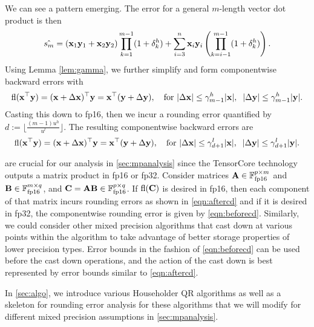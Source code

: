We can see a pattern emerging. 
The error for a general $m$-length vector dot product is then
\begin{equation}
\label{eqn:dperr_2}
\hat{s_m} = (\bb{x}_1\bb{y}_1+\bb{x}_2\bb{y}_2)\prod_{k=1}^{m-1}(1+\dd_{k}^h) + \sum_{i=3}^n \bb{x}_i\bb{y}_i\left(\prod_{k=i-1}^{m-1}(1+\dd_{k}^{h})\right).
\end{equation}
Using Lemma \ref{lem:gamma}, we further simplify and form componentwise backward errors with
\begin{equation}
\fl(\bb{x}^{\top}\bb{y}) =(\bb{x}+\Delta\bb{x})^{\top}\bb{y} = \bb{x}^{\top}(\bb{y}+\Delta\bb{y}),\quad\text{for }|\Delta \bb{x}| \leq \gamma^h_{m-1}|\bb{x}|,\;\; |\Delta \bb{y}|  \leq \gamma_{m-1}^h|\bb{y}|. \label{eqn:beforecd}
\end{equation}
Casting this down to fp16, then we incur a rounding error quantified by $d:=\lfloor\frac{(m-1)u^h}{u^l}\rfloor$. 
The resulting componentwise backward errors are
\begin{equation}
\fl(\bb{x}^{\top}\bb{y}) = (\bb{x}+\Delta\bb{x})^{\top}\bb{y} = \bb{x}^{\top}(\bb{y}+\Delta\bb{y}),\quad\text{for }|\Delta \bb{x}| \leq \gamma^l_{d+1}|\bb{x}|,\;\; |\Delta \bb{y}|  \leq \gamma_{d+1}^l|\bb{y}|. \label{eqn:aftercd}
\end{equation}

 are crucial for our analysis in \cref{sec:mpanalysis} since the TensorCore technology outputs a matrix product in fp16 or fp32. 
Consider matrices $\mathbf{A}\in\mathbb{F}_{\text{fp16}}^{p\times m}$ and $\mathbf{B}\in\mathbb{F}_{\text{fp16}}^{m\times q}$, and $\mathbf{C}=\mathbf{A}\mathbf{B}\in\mathbb{F}_{\text{fp16}}^{p\times q}$.
If $\mathrm{fl}(\mathbf{C})$ is desired in fp16, then each component of that matrix incurs rounding errors as shown in \cref{eqn:aftercd} and if it is desired in fp32, the componentwise rounding error is given by \cref{eqn:beforecd}.
Similarly, we could consider other mixed precision algorithms that cast down at various points within the algorithm to take advantage of better storage properties of lower precision types. 
Error bounds in the fashion of \cref{eqn:beforecd} can be used before the cast down operations, and the action of the cast down is best represented by error bounds similar to \cref{eqn:aftercd}.\par

In \cref{sec:algo}, we introduce various Householder QR algorithms as well as a skeleton for rounding error analysis for these algorithms that we will modify for different mixed precision assumptions in \cref{sec:mpanalysis}.